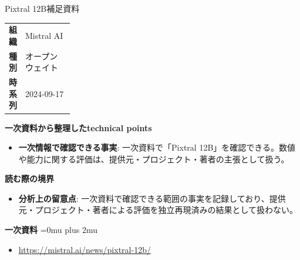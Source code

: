\begin{technicalnote}{Pixtral 12B}{補足資料}
\begingroup
\begin{tabularx}{\linewidth}{@{}>{\bfseries}p{0.22\linewidth}X@{}}
組織 & Mistral AI \\
種別 & オープンウェイト \\
時系列 & 2024-09-17 \\
\end{tabularx}
\smallskip
{\bfseries 一次資料から整理したtechnical points}
\begin{itemize}[leftmargin=1.5em,itemsep=0.35em]
\item \textbf{一次情報で確認できる事実}: 一次資料で「Pixtral 12B」を確認できる。数値や能力に関する評価は、提供元・プロジェクト・著者の主張として扱う。
\end{itemize}
\begin{minipage}{\linewidth}
{\bfseries 読む際の境界}
\begin{itemize}[leftmargin=1.5em,itemsep=0.35em]
\item \textbf{分析上の留意点}: 一次資料で確認できる範囲の事実を記録しており、提供元・プロジェクト・著者による評価を独立再現済みの結果として扱わない。
\end{itemize}
\begin{samepage}
{\bfseries 一次資料}
\begingroup\sloppy
\Urlmuskip=0mu plus 2mu\relax
\begin{itemize}[leftmargin=1.5em,itemsep=0.25em]
\item {\scriptsize\url{https://mistral.ai/news/pixtral-12b/}}
\end{itemize}
\endgroup
\end{samepage}
\end{minipage}
\endgroup
\end{technicalnote}
\medskip

